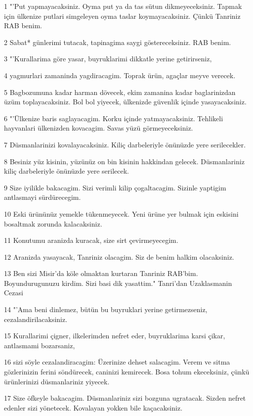 \par 1 "'Put yapmayacaksiniz. Oyma put ya da tas sütun dikmeyeceksiniz. Tapmak için ülkenize putlari simgeleyen oyma taslar koymayacaksiniz. Çünkü Tanriniz RAB benim.
\par 2 Sabat* günlerimi tutacak, tapinagima saygi göstereceksiniz. RAB benim.
\par 3 "'Kurallarima göre yasar, buyruklarimi dikkatle yerine getirirseniz,
\par 4 yagmurlari zamaninda yagdiracagim. Toprak ürün, agaçlar meyve verecek.
\par 5 Bagbozumuna kadar harman dövecek, ekim zamanina kadar baglarinizdan üzüm toplayacaksiniz. Bol bol yiyecek, ülkenizde güvenlik içinde yasayacaksiniz.
\par 6 "'Ülkenize baris saglayacagim. Korku içinde yatmayacaksiniz. Tehlikeli hayvanlari ülkenizden kovacagim. Savas yüzü görmeyeceksiniz.
\par 7 Düsmanlarinizi kovalayacaksiniz. Kiliç darbeleriyle önünüzde yere serilecekler.
\par 8 Besiniz yüz kisinin, yüzünüz on bin kisinin hakkindan gelecek. Düsmanlariniz kiliç darbeleriyle önünüzde yere serilecek.
\par 9 Size iyilikle bakacagim. Sizi verimli kilip çogaltacagim. Sizinle yaptigim antlasmayi sürdürecegim.
\par 10 Eski ürününüz yemekle tükenmeyecek. Yeni ürüne yer bulmak için eskisini bosaltmak zorunda kalacaksiniz.
\par 11 Konutumu aranizda kuracak, size sirt çevirmeyecegim.
\par 12 Aranizda yasayacak, Tanriniz olacagim. Siz de benim halkim olacaksiniz.
\par 13 Ben sizi Misir'da köle olmaktan kurtaran Tanriniz RAB'bim. Boyundurugunuzu kirdim. Sizi basi dik yasattim." Tanri'dan Uzaklasmanin Cezasi
\par 14 "'Ama beni dinlemez, bütün bu buyruklari yerine getirmezseniz, cezalandirilacaksiniz.
\par 15 Kurallarimi çigner, ilkelerimden nefret eder, buyruklarima karsi çikar, antlasmami bozarsaniz,
\par 16 sizi söyle cezalandiracagim: Üzerinize dehset salacagim. Verem ve sitma gözlerinizin ferini söndürecek, caninizi kemirecek. Bosa tohum ekeceksiniz, çünkü ürünlerinizi düsmanlariniz yiyecek.
\par 17 Size öfkeyle bakacagim. Düsmanlariniz sizi bozguna ugratacak. Sizden nefret edenler sizi yönetecek. Kovalayan yokken bile kaçacaksiniz.
